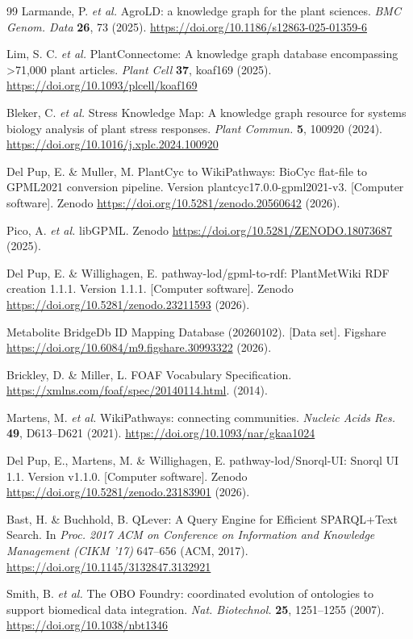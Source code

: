\documentclass[11pt,a4paper]{article}
\begin{document}
\begin{thebibliography}{99}
Larmande, P. \textit{et al.} AgroLD: a knowledge graph for the plant sciences. \textit{BMC Genom. Data} \textbf{26}, 73 (2025). \url{https://doi.org/10.1186/s12863-025-01359-6}

Lim, S. C. \textit{et al.} PlantConnectome: A knowledge graph database encompassing >71,000 plant articles. \textit{Plant Cell} \textbf{37}, koaf169 (2025). \url{https://doi.org/10.1093/plcell/koaf169}

Bleker, C. \textit{et al.} Stress Knowledge Map: A knowledge graph resource for systems biology analysis of plant stress responses. \textit{Plant Commun.} \textbf{5}, 100920 (2024). \url{https://doi.org/10.1016/j.xplc.2024.100920}

Del Pup, E. \& Muller, M. PlantCyc to WikiPathways: BioCyc flat-file to GPML2021 conversion pipeline. Version plantcyc17.0.0-gpml2021-v3. [Computer software]. Zenodo \url{https://doi.org/10.5281/zenodo.20560642} (2026).

Pico, A. \textit{et al.} libGPML. Zenodo \url{https://doi.org/10.5281/ZENODO.18073687} (2025).

Del Pup, E. \& Willighagen, E. pathway-lod/gpml-to-rdf: PlantMetWiki RDF creation 1.1.1. Version 1.1.1. [Computer software]. Zenodo \url{https://doi.org/10.5281/zenodo.23211593} (2026).

Metabolite BridgeDb ID Mapping Database (20260102). [Data set]. Figshare \url{https://doi.org/10.6084/m9.figshare.30993322} (2026).

Brickley, D. \& Miller, L. FOAF Vocabulary Specification. \url{https://xmlns.com/foaf/spec/20140114.html}. (2014).

Martens, M. \textit{et al.} WikiPathways: connecting communities. \textit{Nucleic Acids Res.} \textbf{49}, D613--D621 (2021). \url{https://doi.org/10.1093/nar/gkaa1024}

Del Pup, E., Martens, M. \& Willighagen, E. pathway-lod/Snorql-UI: Snorql UI 1.1. Version v1.1.0. [Computer software]. Zenodo \url{https://doi.org/10.5281/zenodo.23183901} (2026).

Bast, H. \& Buchhold, B. QLever: A Query Engine for Efficient SPARQL+Text Search. In \textit{Proc. 2017 ACM on Conference on Information and Knowledge Management (CIKM '17)} 647--656 (ACM, 2017). \url{https://doi.org/10.1145/3132847.3132921}

Smith, B. \textit{et al.} The OBO Foundry: coordinated evolution of ontologies to support biomedical data integration. \textit{Nat. Biotechnol.} \textbf{25}, 1251--1255 (2007). \url{https://doi.org/10.1038/nbt1346}

\end{thebibliography}
\end{document}
